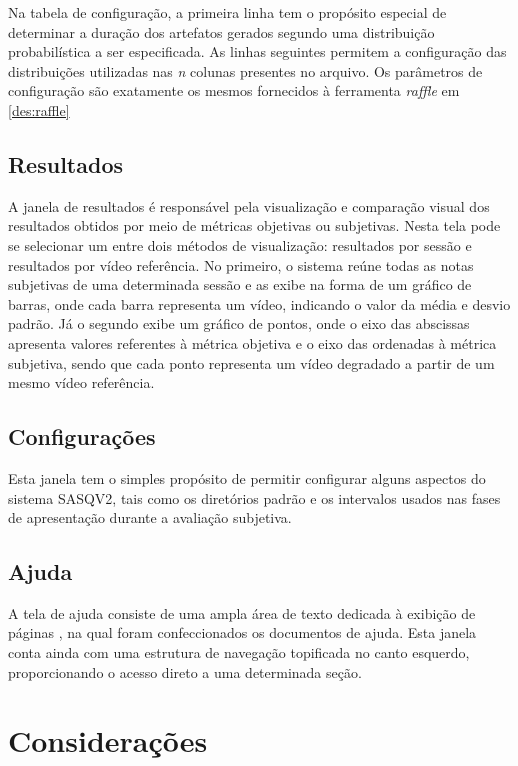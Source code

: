 Na tabela de configuração, a primeira linha tem o propósito especial de determinar a duração dos artefatos gerados segundo uma distribuição probabilística a ser especificada.
As linhas seguintes permitem a configuração das distribuições utilizadas nas \emph{n} colunas presentes no arquivo.
Os parâmetros de configuração são exatamente os mesmos fornecidos à ferramenta \emph{raffle} em \ref{des:raffle}

\subsection{Resultados}

A janela de resultados é responsável pela visualização e comparação visual dos resultados obtidos por meio de métricas objetivas ou subjetivas.
Nesta tela pode se selecionar um entre dois métodos de visualização: resultados por sessão e resultados por vídeo referência.
No primeiro, o sistema reúne todas as notas subjetivas de uma determinada sessão e as exibe na forma de um gráfico de barras, onde cada barra representa um vídeo, indicando o valor da média e desvio padrão.
Já o segundo exibe um gráfico de pontos, onde o eixo das abscissas apresenta valores referentes à métrica objetiva e o eixo das ordenadas à métrica subjetiva, sendo que cada ponto representa um vídeo degradado a partir de um mesmo vídeo referência.

\label{des:resultados}

\subsection{Configurações}

Esta janela tem o simples propósito de permitir configurar alguns aspectos do sistema SASQV2, tais como os diretórios padrão e os intervalos usados nas fases de apresentação durante a avaliação subjetiva.

\subsection{Ajuda}

A tela de ajuda consiste de uma ampla área de texto dedicada à exibição de páginas , na qual foram confeccionados os documentos de ajuda.
Esta janela conta ainda com uma estrutura de navegação topificada no canto esquerdo, proporcionando o acesso direto a uma determinada seção.

\section{Considerações}

